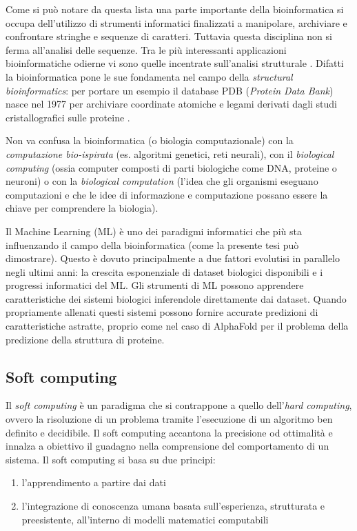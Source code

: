 \par Come si può notare da questa lista una parte importante della bioinformatica si occupa dell'utilizzo di strumenti informatici finalizzati a manipolare, archiviare e confrontare stringhe e sequenze di caratteri. Tuttavia questa disciplina non si ferma all’analisi delle sequenze. Tra le più interessanti applicazioni bioinformatiche odierne vi sono quelle incentrate sull’analisi strutturale \supercite{baxevanis2020bioinformatics}. Difatti la bioinformatica pone le sue fondamenta nel campo della \textit{structural bioinformatics}: per portare un esempio il database PDB (\textit{Protein Data Bank}) nasce nel 1977 per archiviare coordinate atomiche e legami derivati dagli studi cristallografici sulle proteine \supercite{bernstein77}.

\par Non va confusa la bioinformatica (o biologia computazionale) con la \textit{computazione bio-ispirata} (es. algoritmi genetici, reti neurali), con il \textit{biological computing} (ossia computer composti di parti biologiche come DNA, proteine o neuroni) o con la \textit{biological computation} (l'idea che gli organismi eseguano computazioni e che le idee di informazione e computazione possano essere la chiave per comprendere la biologia)\supercite{Mitchell2010}.

\par Il Machine Learning (ML) è uno dei paradigmi informatici che più sta influenzando il campo della bioinformatica (come la presente tesi può dimostrare). Questo è dovuto principalmente a due fattori evolutisi in parallelo negli ultimi anni: la crescita esponenziale di dataset biologici disponibili e i progressi informatici del ML. Gli strumenti di ML possono apprendere caratteristiche dei sistemi biologici inferendole direttamente dai dataset. Quando propriamente allenati questi sistemi possono fornire accurate predizioni di caratteristiche astratte, proprio come nel caso di AlphaFold per il problema della predizione della struttura di proteine.

\subsection{Soft computing}
Il \textit{soft computing} è un paradigma che si contrappone a quello dell'\textit{hard computing}, ovvero la risoluzione di un problema tramite l'esecuzione di un algoritmo ben definito e decidibile. Il soft computing accantona la precisione od ottimalità e innalza a obiettivo il guadagno nella comprensione del comportamento di un sistema. Il soft computing si basa su due principi: 
\begin{enumerate}
	\item l'apprendimento a partire dai dati
	\item l'integrazione di conoscenza umana basata sull'esperienza, strutturata e preesistente, all'interno di modelli matematici computabili
\end{enumerate}

